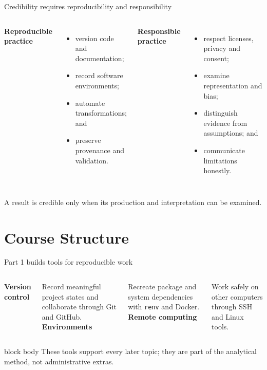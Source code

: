\documentclass[10pt,aspectratio=169]{beamer}
\begin{document}
\begin{frame}{Credibility requires reproducibility and responsibility}
\small
\begin{columns}[T]
\textbf{Reproducible practice}
\begin{itemize}
  \item version code and documentation;
  \item record software environments;
  \item automate transformations; and
  \item preserve provenance and validation.
\end{itemize}
\textbf{Responsible practice}
\begin{itemize}
  \item respect licenses, privacy and consent;
  \item examine representation and bias;
  \item distinguish evidence from assumptions; and
  \item communicate limitations honestly.
\end{itemize}
\end{columns}
\vspace{0.35cm}
\centering
\textcolor{ukudlaRed}{A result is credible only when its production and interpretation can be examined.}
\end{frame}

\section{Course Structure}

\begin{frame}{Part 1 builds tools for reproducible work}
\small
\begin{columns}[T]
\centering
\textbf{Version control}

\scriptsize Record meaningful project states and collaborate through Git and GitHub.
\centering
\textbf{Environments}

\scriptsize Recreate package and system dependencies with \texttt{renv} and Docker.
\centering
\textbf{Remote computing}

\scriptsize Work safely on other computers through SSH and Linux tools.
\end{columns}
\vspace{0.65cm}
\begin{beamercolorbox}[rounded=true,sep=9pt]{block body}
These tools support every later topic; they are part of the analytical method, not administrative extras.
\end{beamercolorbox}
\end{frame}
\end{document}
